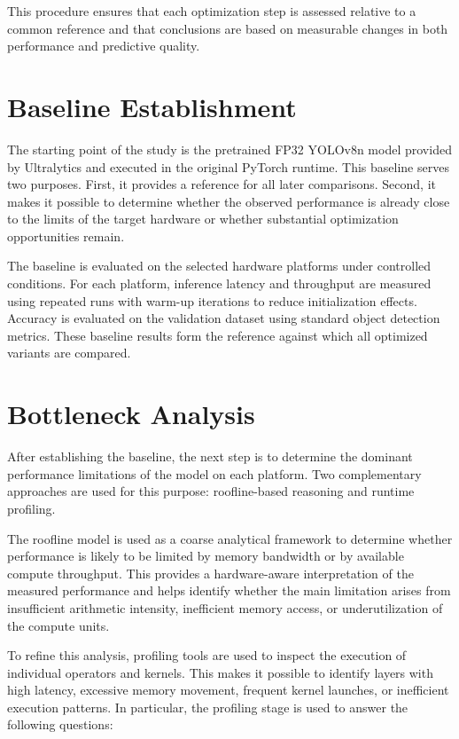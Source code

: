 \documentclass[12pt,a4paper]{report}
\begin{document}
This procedure ensures that each optimization step is assessed relative to a common reference and that conclusions are
based on measurable changes in both performance and predictive quality.

\section{Baseline Establishment}

The starting point of the study is the pretrained FP32 YOLOv8n model provided by Ultralytics and executed in the
original PyTorch runtime. This baseline serves two purposes. First, it provides a reference for all later comparisons.
Second, it makes it possible to determine whether the observed performance is already close to the limits of the target
hardware or whether substantial optimization opportunities remain.

The baseline is evaluated on the selected hardware platforms under controlled conditions. For each platform, inference
latency and throughput are measured using repeated runs with warm-up iterations to reduce initialization effects.
Accuracy is evaluated on the validation dataset using standard object detection metrics. These baseline results form
the reference against which all optimized variants are compared.

\section{Bottleneck Analysis}

After establishing the baseline, the next step is to determine the dominant performance limitations of the model on
each platform. Two complementary approaches are used for this purpose: roofline-based reasoning and runtime profiling.

The roofline model is used as a coarse analytical framework to determine whether performance is likely to be limited
by memory bandwidth or by available compute throughput. This provides a hardware-aware interpretation of the measured
performance and helps identify whether the main limitation arises from insufficient arithmetic intensity, inefficient
memory access, or underutilization of the compute units.

To refine this analysis, profiling tools are used to inspect the execution of individual operators and kernels. This
makes it possible to identify layers with high latency, excessive memory movement, frequent kernel launches, or
inefficient execution patterns. In particular, the profiling stage is used to answer the following questions:
\end{document}
